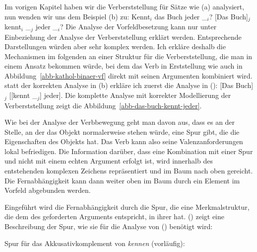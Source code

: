 Im vorigen Kapitel haben wir die Verberststellung für Sätze wie (a) analysiert, nun wenden wir uns
dem Beispiel (b) zu:
\eal
\ex Kennt$_i$ das Buch jeder \_$_i$?
\ex {}[Das Buch]$_j$ kennt$_i$ \_$_j$ jeder \_$_i$?
\zl
Die Analyse der Vorfeldbesetzung kann nur unter Einbeziehung der Analyse der Verberststellung erklärt
werden. Entsprechende Darstellungen würden aber sehr komplex werden. Ich erkläre deshalb
die Mechanismen im folgenden an einer Struktur für die Verberststellung, die man in einem
Ansatz %
bekommen würde, bei dem das Verb in Erststellung wie auch in Abbildung~\ref{abb-kathol-binaer-vf}
direkt mit seinen Argumenten kombiniert wird. \Dh statt der korrekten Analyse in (b) erkläre
ich zuerst die Analyse in ():
\ea
{}[Das Buch]$_j$ [[kennt \_$_j$] jeder].\label{ex-das-buch-kennt}
\z 
Die komplette Analyse mit korrekter Modellierung der Verberststellung zeigt
die Abbildung~\vref{abb-das-buch-kennt-jeder}.


Wie bei der Analyse der Verbbewegung geht man davon aus, dass es an der Stelle, an der
das Objekt normalerweise stehen würde, eine Spur gibt, die die Eigenschaften des Objekts
hat. Das Verb kann also seine Valenzanforderungen lokal befriedigen. Die Information darüber,
dass eine Kombination mit einer Spur und nicht mit einem echten Argument erfolgt ist,
wird innerhalb des entstehenden komplexen Zeichens repräsentiert und im Baum nach oben gereicht.
Die Fernabhängigkeit kann dann weiter oben im Baum durch ein Element im Vorfeld abgebunden werden.

Eingeführt wird die Fernabhängigkeit durch die Spur, die eine
Merkmalstruktur, die dem \localw des geforderten Arguments entspricht, in ihrer
\slashl hat. () zeigt eine Beschreibung der Spur, wie sie für die Analyse von () benötigt wird:

\eas
\label{le-spur-acc-o-kennen}
Spur für das Akkusativkomplement von \emph{kennen} (vorläufig):\\
\zs

